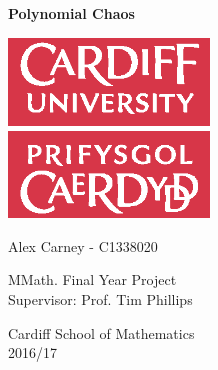 \begin{titlepage}
    \begin{center}
        \vspace*{5cm}

        {\Huge\textbf{Polynomial Chaos}}

        \vspace{0.5cm}
        \includegraphics[width=0.4\textwidth]{img/universitylogo.eps}

        \vspace{1.5cm}

        {\Huge Alex Carney -  C1338020}

        \vfill

        {\Large MMath. Final Year Project \\ Supervisor: Prof. Tim Phillips}

        \vspace{0.5cm}
        {\Large Cardiff School of Mathematics \\ 2016/17}
        \vspace{1.5cm}



    \end{center}
\end{titlepage}
